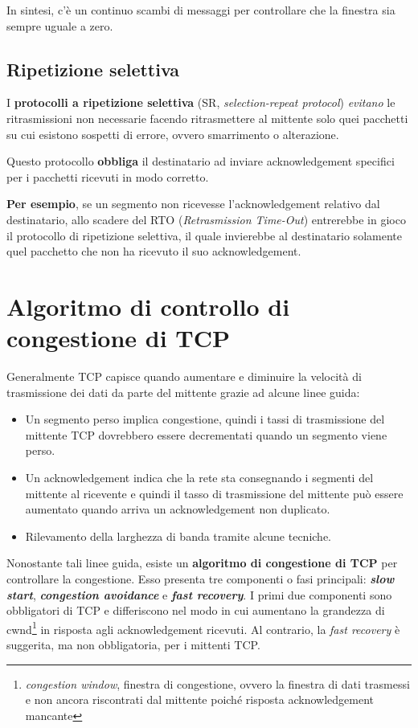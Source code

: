 \documentclass[a4paper]{article}
\begin{document}
	\noindent
	In sintesi, c’è un continuo scambi di messaggi per controllare che la finestra sia sempre uguale a zero.
	
	\subsection{Ripetizione selettiva}
	
	I \textcolor{Red3}{\textbf{protocolli a ripetizione selettiva}} (SR, \emph{selection-repeat protocol}) \emph{evitano} le ritrasmissioni non necessarie facendo ritrasmettere al mittente solo quei pacchetti su cui esistono sospetti di errore, ovvero smarrimento o alterazione.\newline
	
	\noindent
	Questo protocollo \textbf{obbliga} il destinatario ad inviare acknowledgement specifici per i pacchetti ricevuti in modo corretto.\newline
	
	\noindent
	\textbf{Per esempio}, se un segmento non ricevesse l’acknowledgement relativo dal destinatario, allo scadere del RTO (\emph{Retrasmission Time-Out}) entrerebbe in gioco il protocollo di ripetizione selettiva, il quale invierebbe al destinatario solamente quel pacchetto che non ha ricevuto il suo acknowledgement.\newpage
	
	\section{Algoritmo di controllo di congestione di TCP}
	
	Generalmente TCP capisce quando aumentare e diminuire la velocità di trasmissione dei dati da parte del mittente grazie ad alcune linee guida:
	\begin{itemize}
		\item Un segmento perso implica congestione, quindi i tassi di trasmissione del mittente TCP dovrebbero essere decrementati quando un segmento viene perso.
		\item Un acknowledgement indica che la rete sta consegnando i segmenti del mittente al ricevente e quindi il tasso di trasmissione del mittente può essere aumentato quando arriva un acknowledgement non duplicato.
		\item Rilevamento della larghezza di banda tramite alcune tecniche.
	\end{itemize}
	Nonostante tali linee guida, esiste un \textcolor{Red3}{\textbf{algoritmo di congestione di TCP}} per controllare la congestione. Esso presenta tre componenti o fasi principali: \textbf{\emph{slow start}}, \textbf{\emph{congestion avoidance}} e \textbf{\emph{fast recovery}}. I primi due componenti sono obbligatori di TCP e differiscono nel modo in cui aumentano la grandezza di \textsf{cwnd}\footnote{\emph{congestion window}, finestra di congestione, ovvero la finestra di dati trasmessi e non ancora riscontrati dal mittente poiché risposta acknowledgement mancante} in risposta agli acknowledgement ricevuti.  Al contrario, la \emph{fast recovery} è suggerita, ma non obbligatoria, per i mittenti TCP.\newpage
	
\end{document}
